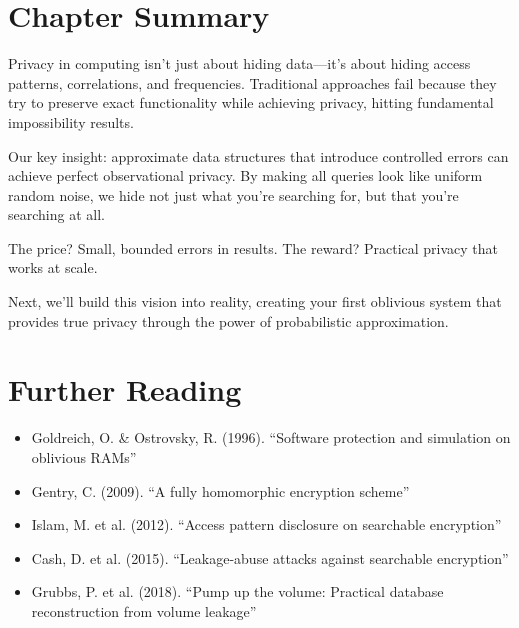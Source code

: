\section{Chapter Summary}

Privacy in computing isn't just about hiding data—it's about hiding access patterns, correlations, and frequencies. Traditional approaches fail because they try to preserve exact functionality while achieving privacy, hitting fundamental impossibility results.

Our key insight: approximate data structures that introduce controlled errors can achieve perfect observational privacy. By making all queries look like uniform random noise, we hide not just what you're searching for, but that you're searching at all.

The price? Small, bounded errors in results. The reward? Practical privacy that works at scale.

Next, we'll build this vision into reality, creating your first oblivious system that provides true privacy through the power of probabilistic approximation.

\section{Further Reading}

\begin{itemize}
\item Goldreich, O. \& Ostrovsky, R. (1996). ``Software protection and simulation on oblivious RAMs''
\item Gentry, C. (2009). ``A fully homomorphic encryption scheme''
\item Islam, M. et al. (2012). ``Access pattern disclosure on searchable encryption''
\item Cash, D. et al. (2015). ``Leakage-abuse attacks against searchable encryption''
\item Grubbs, P. et al. (2018). ``Pump up the volume: Practical database reconstruction from volume leakage''
\end{itemize}